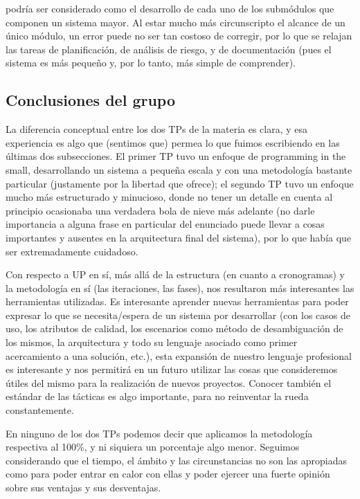  podría ser considerado como el desarrollo de cada uno de los submódulos que componen un sistema mayor. Al estar mucho más circunscripto el alcance de un único módulo, un error puede no ser tan costoso de corregir, por lo que se relajan las tareas de planificación, de análisis de riesgo, y de documentación (pues el sistema es más pequeño y, por lo tanto, más simple de comprender).

\newpage
\subsection{Conclusiones del grupo}
La diferencia conceptual entre los dos TPs de la materia es clara, y esa experiencia es algo que (sentimos que) permea lo que fuimos escribiendo en las últimas dos subsecciones. El primer TP tuvo un enfoque de programming in the small, desarrollando un sistema a pequeña escala y con una metodología bastante particular (justamente por la libertad que ofrece); el segundo TP tuvo un enfoque mucho más estructurado y minucioso, donde no tener un detalle en cuenta al principio ocasionaba una verdadera bola de nieve más adelante (no darle importancia a alguna frase en particular del enunciado puede llevar a cosas importantes y ausentes en la arquitectura final del sistema), por lo que había que ser extremadamente cuidadoso.

Con respecto a UP en sí, más allá de la estructura (en cuanto a cronogramas) y la metodología en sí (las iteraciones, las fases), nos resultaron más interesantes las herramientas utilizadas. Es interesante aprender nuevas herramientas para poder expresar lo que se necesita/espera de un sistema por desarrollar (con los casos de uso, los atributos de calidad, los escenarios como método de desambiguación de los mismos, la arquitectura y todo su lenguaje asociado como primer acercamiento a una solución, etc.), esta expansión de nuestro lenguaje profesional es interesante y nos permitirá en un futuro utilizar las cosas que consideremos útiles del mismo para la realización de nuevos proyectos. Conocer también el estándar de las tácticas es algo importante, para no reinventar la rueda constantemente.

En ninguno de los dos TPs podemos decir que aplicamos la metodología respectiva al 100\%, y ni siquiera un porcentaje algo menor. Seguimos considerando que el tiempo, el ámbito y las circunstancias no son las apropiadas como para poder entrar en calor con ellas y poder ejercer una fuerte opinión sobre sus ventajas y sus desventajas.

